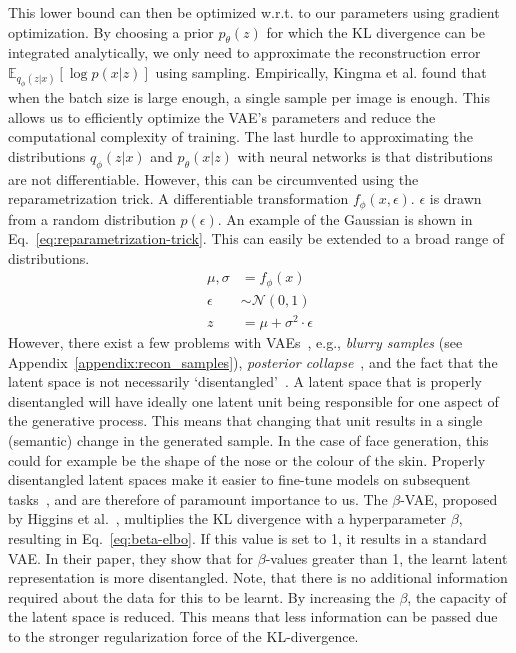 This lower bound can then be optimized w.r.t. to our parameters using gradient optimization. By choosing a prior $p_\theta(z)$ for which the KL divergence can be integrated analytically, we only need to approximate the reconstruction error $\mathbb{E}_{q_{\phi}(z|x)}[\log p(x|z)]$ using sampling. Empirically, Kingma et al. found that when the batch size is large enough, a single sample per image is enough. This allows us to efficiently optimize the VAE's parameters and reduce the computational complexity of training. The last hurdle to approximating the distributions $q_{\phi}(z | x)$ and $p_{\theta}(x | z)$ with neural networks is that distributions are not differentiable. However, this can be circumvented using the reparametrization trick. A differentiable transformation $f_\phi(x, \epsilon)$. $\epsilon$ is drawn from a random distribution $p(\epsilon)$. An example of the Gaussian is shown in Eq.~\ref{eq:reparametrization-trick}. This can easily be extended to a broad range of distributions.
\begin{equation}
    \begin{split}
        \mu, \sigma & = f_\phi(x)                     \\
        \epsilon    & \sim \mathcal{N}(0, 1)          \\
        z           & = \mu + \sigma^2 \cdot \epsilon
    \end{split}
    \label{eq:reparametrization-trick}
\end{equation}
However, there exist a few problems with VAEs~\cite{tomczak2021deep}, e.g., \emph{blurry samples} (see Appendix~\ref{appendix:recon_samples}), \emph{posterior collapse}~\cite{DBLP:journals/corr/BowmanVVDJB15}, and the fact that the latent space is not necessarily `disentangled'~\cite{higgins2017betavae}. A latent space that is properly disentangled will have ideally one latent unit being responsible for one aspect of the generative process. This means that changing that unit results in a single (semantic) change in the generated sample. In the case of face generation, this could for example be the shape of the nose or the colour of the skin. Properly disentangled latent spaces make it easier to fine-tune models on subsequent tasks~\cite{bengio2014representationlearningreviewnew}, and are therefore of paramount importance to us. The $\beta$-VAE, proposed by Higgins et al.~\cite{higgins2017betavae}, multiplies the KL divergence with a hyperparameter $\beta$, resulting in Eq.~\ref{eq:beta-elbo}. If this value is set to 1, it results in a standard VAE. In their paper, they show that for $\beta$-values greater than 1, the learnt latent representation is more disentangled. Note, that there is no additional information required about the data for this to be learnt. By increasing the $\beta$, the capacity of the latent space is reduced. This means that less information can be passed due to the stronger regularization force of the KL-divergence.
